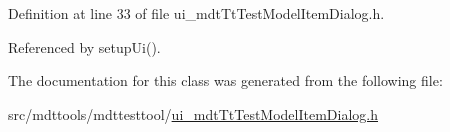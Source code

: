 Definition at line 33 of file ui\-\_\-mdt\-Tt\-Test\-Model\-Item\-Dialog.\-h.



Referenced by setup\-Ui().



The documentation for this class was generated from the following file\-:\begin{DoxyCompactItemize}
\item 
src/mdttools/mdttesttool/\hyperlink{ui__mdt_tt_test_model_item_dialog_8h}{ui\-\_\-mdt\-Tt\-Test\-Model\-Item\-Dialog.\-h}\end{DoxyCompactItemize}

